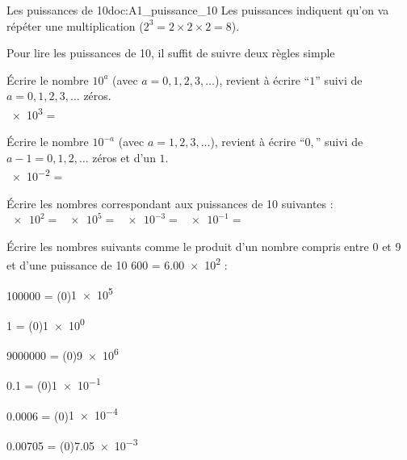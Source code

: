 \teteSndMeth

\vspace*{-36pt}


\vspace*{-10pt}

\begin{doc}{Les puissances de 10}{doc:A1_puissance_10}
  Les puissances indiquent qu'on va répéter une multiplication ($2^3 = 2 \times 2 \times 2 = 8$).
  
  Pour lire les puissances de 10, il suffit de suivre deux règles simple
  \begin{importants}
    \pointCyan Écrire le nombre $10^a$ (avec $a = 0, 1, 2, 3, \ldots$), revient à écrire ``$1$'' suivi de $a = 0, 1, 2, 3, \ldots$ zéros. \\
    \exemple \num{e3} =

    \pointCyan Écrire le nombre $10^{-a}$ (avec $a = 1, 2, 3, \ldots$), revient à écrire ``$0,$'' suivi de $a - 1 = 0, 1, 2, \ldots$ zéros et d'un $1$. \\
    \exemple \num{e-2} =
  \end{importants}
\end{doc}


\numeroQuestion Écrire les nombres correspondant aux puissances de 10 suivantes : \\
$\num{e2}  =$  \qq{}
$\num{e5}  =$  \qq{}
$\num{e-3} =$  \qq{}
$\num{e-1} =$ 

\numeroQuestion Écrire les nombres suivants comme le produit d'un nombre compris entre 0 et 9 et d'une puissance de 10 \exemple \num{600} = \num{6,00e2} :
\pasCorrection{\vspace*{-4pt}}
\begin{listePoints}[2]
  \setlength\itemsep{-4pt}
  \item \num{100000}  = \texteTrou(0){\num{1e5}}
  \item \num{1}       = \texteTrou(0){\num{1e0}}
  \item \num{9000000} = \texteTrou(0){\num{9e6}}
  \item \num{0,1}     = \texteTrou(0){\num{1e-1}}
  \item \num{0,0006}  = \texteTrou(0){\num{1e-4}}
  \item \num{0,00705} = \texteTrou(0){\num{7,05e-3}}
\end{listePoints}


